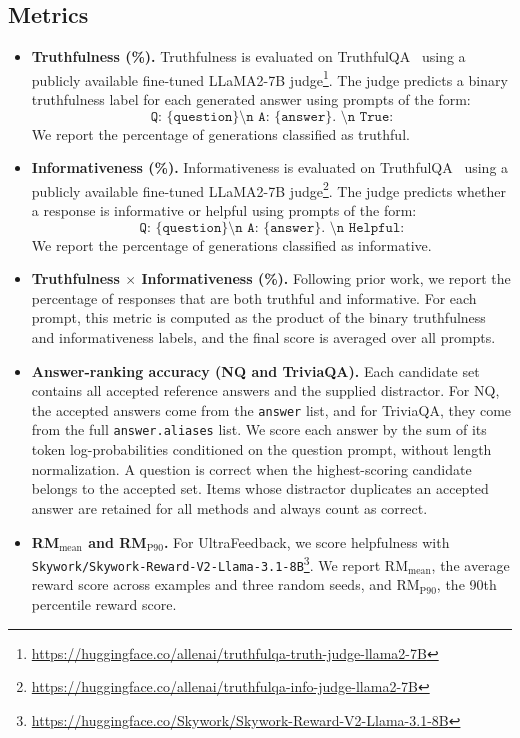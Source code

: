 \subsection{Metrics}
\label{appendix:metrics}
\begin{itemize}
    \item \textbf{Truthfulness (\%).}
    Truthfulness is evaluated on TruthfulQA~\cite{lin2021truthfulqa} using a publicly available fine-tuned LLaMA2-7B judge\footnote{\url{https://huggingface.co/allenai/truthfulqa-truth-judge-llama2-7B}}. The judge predicts a binary truthfulness label for each generated answer using prompts of the form:
    \[
    \texttt{Q: \{question\} \textbackslash n A: \{answer\}. \textbackslash n True:}
    \]
    We report the percentage of generations classified as truthful.

    \item \textbf{Informativeness (\%).}
    Informativeness is evaluated on TruthfulQA~\cite{lin2021truthfulqa} using a publicly available fine-tuned LLaMA2-7B judge\footnote{\url{https://huggingface.co/allenai/truthfulqa-info-judge-llama2-7B}}. The judge predicts whether a response is informative or helpful using prompts of the form:
    \[
    \texttt{Q: \{question\} \textbackslash n A: \{answer\}. \textbackslash n Helpful:}
    \]
    We report the percentage of generations classified as informative.

    \item \textbf{Truthfulness $\times$ Informativeness (\%).}
    Following prior work, we report the percentage of responses that are both truthful and informative. For each prompt, this metric is computed as the product of the binary truthfulness and informativeness labels, and the final score is averaged over all prompts.

    \item \textbf{Answer-ranking accuracy (NQ and TriviaQA).}
    Each candidate set contains all accepted reference answers and the supplied distractor. For NQ, the accepted answers come from the \texttt{answer} list, and for TriviaQA, they come from the full \texttt{answer.aliases} list. We score each answer by the sum of its token log-probabilities conditioned on the question prompt, without length normalization. A question is correct when the highest-scoring candidate belongs to the accepted set. Items whose distractor duplicates an accepted answer are retained for all methods and always count as correct.

    \item \textbf{RM$_{\text{mean}}$ and RM$_{\text{P90}}$.}
    For UltraFeedback, we score helpfulness with \texttt{Skywork/Skywork-Reward-V2-Llama-3.1-8B}\footnote{\url{https://huggingface.co/Skywork/Skywork-Reward-V2-Llama-3.1-8B}}. We report RM$_{\text{mean}}$, the average reward score across examples and three random seeds, and RM$_{\text{P90}}$, the 90th percentile reward score.


\end{itemize}
